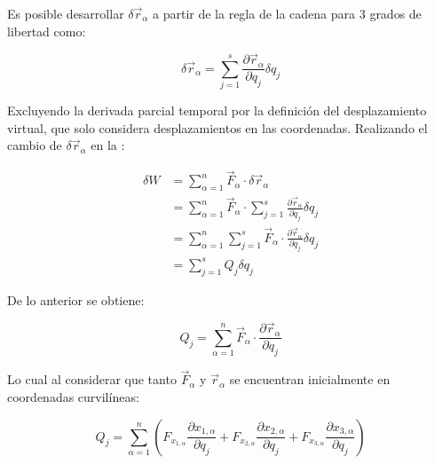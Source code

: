 \documentclass[/home/hernan/Documentos/Apuntes_mecanica_teorica/main.tex]{subfiles}
\begin{document}
    Es posible desarrollar $ \delta \vec{r}_{\alpha}$ a partir de la regla de la cadena para $3$ grados de libertad como:

    \begin{equation*}
        \delta \vec{r}_{\alpha} = \sum_{j=1}^{s} \frac{\partial \vec{r}_{\alpha}}{\partial q_{j}} \delta q_{j}
    \end{equation*}

    Excluyendo la derivada parcial temporal por la definición del desplazamiento virtual, que solo considera desplazamientos en las coordenadas. Realizando el cambio de $\delta \vec{r}_{\alpha}$  en la :

    \begin{align*}
        \delta W & = \sum_{\alpha=1}^{n} \vec{F}_{\alpha}  \cdot \delta \vec{r}_{\alpha} \\ 
                & = \sum_{\alpha=1}^{n} \vec{F}_{\alpha}  \cdot \sum_{j=1}^{s} \frac{\partial \vec{r}_{\alpha}}{\partial q_{j}} \delta q_{j} \\ 
                & = \sum_{\alpha=1}^{n} \sum_{j=1}^{s} \vec{F}_{\alpha} \cdot \frac{\partial \vec{r}_{\alpha}}{\partial q_{j}} \delta q_{j} \\ 
                & = \sum_{j=1}^{s} Q_{j} \delta q_{j}
    \end{align*}

    De lo anterior se obtiene:

    \begin{equation*}
        Q_{j} = \sum_{\alpha=1}^{n} \vec{F}_{\alpha} \cdot \frac{\partial \vec{r}_{\alpha}}{\partial q_{j}} 
    \end{equation*}

    Lo cual al considerar que tanto $\vec{F}_{\alpha}$ y $\vec{r}_{\alpha}$ se encuentran inicialmente en coordenadas curvilíneas:

    \begin{equation*}
        Q_{j} = \sum_{\alpha=1}^{n} \left( F_{x_{1,\alpha}} \frac{\partial x_{1,\alpha}}{\partial q_{j}} +   F_{x_{2,\alpha}} \frac{\partial x_{2,\alpha}}{\partial q_{j}} + F_{x_{3,\alpha}} \frac{\partial x_{3,\alpha}}{\partial q_{j}} \right)
    \end{equation*}
\end{document}
